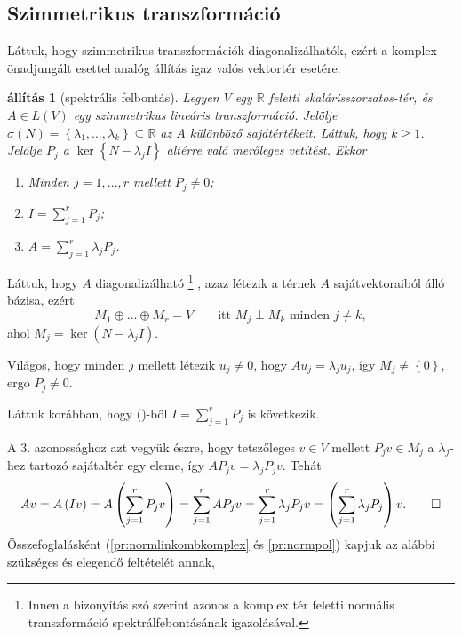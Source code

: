 \documentclass[9pt, a4paper, showtrims]{memoir}
\makeatletter
\renewenvironment{proof}[1][\proofname]
    {\par\pushQED{\qed}%
    \normalfont \topsep6\p@\@plus6\p@\relax
    \trivlist
    \item[\hskip\labelsep
        \itshape
    #1\@addpunct{:}]\ignorespaces}
    {\popQED\endtrivlist\@endpefalse}
\theoremstyle{plain}
\newtheorem{proposition}{állítás}[chapter]
\theoremstyle{remark}
\theoremstyle{definition}
\makeatother
\begin{document}
\subsection{Szimmetrikus transzformáció}
Láttuk, hogy szimmetrikus transzformációk diagonalizálhatók,
ezért a komplex önadjungált esettel analóg állítás igaz valós vektortér esetére.
\begin{proposition}[spektrális felbontás]
    Legyen $V$ egy $\mathbb{R}$ feletti skalárisszorzatos-tér, és $A\in L\left( V \right)$
    egy szimmetrikus lineáris transzformáció.
    Jelölje $\sigma\left( N \right)=\left\{\lambda_1,\dots,\lambda_k  \right\}\subseteq\mathbb{R}$ az $A$ különböző sajátértékeit.
    Láttuk, hogy $k\geq 1$.
    Jelölje $P_j$ a $\ker\left\{ N-\lambda_jI \right\}$ altérre való merőleges vetítést.
    Ekkor
    \begin{enumerate}
        \item Minden $j=1,\dots,r$ mellett $P_j\neq 0$;
        \item $I=\sum_{j=1}^rP_j$;
        \item $A=\sum_{j=1}^r\lambda_jP_j$.
            \qedhere
    \end{enumerate}
\end{proposition}
\begin{proof}
    Láttuk, hogy $A$ diagonalizálható
    \footnote{Innen a bizonyítás szó szerint azonos a komplex tér feletti normális transzformáció spektrálfebontásának igazolásával.}%
    , azaz létezik a térnek $A$ sajátvektoraiból álló
    bázisa,
    ezért
    \[
        M_1\oplus\dots\oplus M_r=V
        \qquad\text{itt }M_j\perp M_k\text{ minden }j\neq k,\tag{\dag}
    \]
    ahol $M_j=\ker\left( N-\lambda_jI \right)$.

    Világos, 
    hogy minden $j$ mellett létezik $u_j\neq 0$, hogy $Au_j=\lambda_ju_j$, 
    így $M_j\neq \left\{ 0 \right\}$,
    ergo $P_j\neq 0.$

    Láttuk korábban, hogy (\dag)-ből $I=\sum_{j=1}^{r}P_j$ is következik.

    A 3. azonossághoz azt vegyük észre, 
    hogy tetszőleges $v\in V$ mellett $P_jv\in M_j$ a $\lambda_j$-hez tartozó sajátaltér egy eleme,
    így $AP_jv=\lambda_jP_jv$. Tehát
    \[
        Av
        =
        A\left( Iv \right)
        =
        A\left( \sum_{j=1}^rP_jv \right)
        =
        \sum_{j=1}^rAP_jv
        =
        \sum_{j=1}^r\lambda_jP_jv
        =
        \left( \sum_{j=1}^r\lambda_jP_j \right)v.
        \qedhere
    \]
\end{proof}
Összefoglalásként (\ref{pr:normlinkombkomplex} és \ref{pr:normpol}) kapjuk az alábbi szükséges és elegendő feltételét annak,
\end{document}
